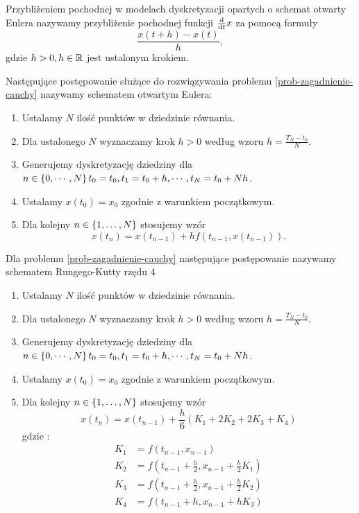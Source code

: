 \documentclass[notheorems]{beamer}
\begin{document}
\begin{frame}
\begin{definition}
Przybliżeniem pochodnej w modelach dyskretyzacji opartych o schemat otwarty Eulera nazywamy przybliżenie pochodnej funkcji $\frac{\mathrm{d} {} }{\mathrm{d}{t}}x$ za pomocą formuły 
$$
 \frac{x(t+h) - x(t)}{h},
$$
gdzie $h >0, h \in \mathbb{R} $ jest ustalonym krokiem. 
\end{definition}  
\end{frame}
\begin{frame}
\begin{algorithm}\label{Euler_algoritm}
Następujące postępowanie służące do rozwiązywania problemu \ref{prob-zagadnienie-cauchy} nazywamy schematem otwartym Eulera:
\begin{enumerate}
\item Ustalamy $N$ ilość punktów w dziedzinie równania. 
\item Dla ustalonego $N$ wyznaczamy krok $h>0$ według wzoru $h=\frac{T_N - t_0}{N}$. 
\item Generujemy dyskretyzację dziedziny dla $ n \in \left\lbrace {0,\cdots,N} \right\rbrace  t_0 = t_0, t_1 = t_0 + h, \cdots, t_N = t_{0}+ Nh$. 
\item Ustalamy $x(t_0) = x_0$ zgodnie z warunkiem początkowym.
\item Dla kolejny $n \in \left\lbrace {1, \ldots, N} \right\rbrace$ stosujemy wzór
$$
x(t_{n}) = x(t_{n-1}) + h f(t_{n-1}, x(t_{n-1})).
$$
\end{enumerate}
\end{algorithm}
\end{frame}
\begin{frame}
\begin{algorithm}
Dla problemu \ref{prob-zagadnienie-cauchy} następujące postępowanie nazywamy schematem Rungego-Kutty rzędu 4 
\begin{enumerate}
\item Ustalamy $N$ ilość punktów w dziedzinie równania. 
\item Dla ustalonego $N$ wyznaczamy krok $h>0$ według wzoru $h=\frac{T_N-t_0}{N}$. 
\item Generujemy dyskretyzację dziedziny dla $n \in \left\lbrace {0,\cdots,N} \right\rbrace  t_0 = t_0, t_1 = t_0 + h, \cdots, t_N = t_{0}+ Nh$. 
\item Ustalamy $x(t_0) = x_0$ zgodnie z warunkiem początkowym.
\item Dla kolejny $n \in \left\lbrace {1, \ldots, N} \right\rbrace$ stosujemy wzór
$$
x(t_{n}) = x(t_{n-1}) + \frac{h}{6} ( K_1 + 2K_2 + 2K_3 + K_4 )
$$
gdzie :
$$
\begin{array}{cl}
K_1 &= f(t_{n-1},x_{n-1}) \\
K_2 &= f(t_{n-1} + \frac{h}{2}, x_{n-1} + \frac{h}{2} K_1) \\
K_3 &= f(t_{n-1} + \frac{h}{2}, x_{n-1} + \frac{h}{2} K_2) \\
K_4 &= f(t_{n-1} + h, x_{n-1} + hK_3) 
\end{array}
$$
\end{enumerate}
\end{algorithm}
\end{frame}
\end{document}
